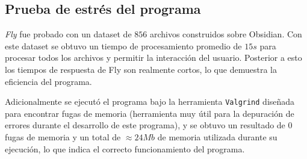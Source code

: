 \subsection{Prueba de estrés del programa}
\textit{Fly} fue probado con un dataset de $856$ archivos construidos sobre Obsidian. Con este dataset se obtuvo un tiempo de procesamiento promedio de $15s$ para procesar todos los archivos y permitir la interacción del usuario. Posterior a esto los tiempos de respuesta de Fly son realmente cortos, lo que demuestra la eficiencia del programa.

Adicionalmente se ejecutó el programa bajo la herramienta \texttt{Valgrind} diseñada para encontrar fugas de memoria (herramienta muy útil para la depuración de errores durante el desarrollo de este programa), y se obtuvo un resultado de $0$ fugas de memoria y un total de $\approx 24Mb$ de memoria utilizada durante su ejecución, lo que indica el correcto funcionamiento del programa.
